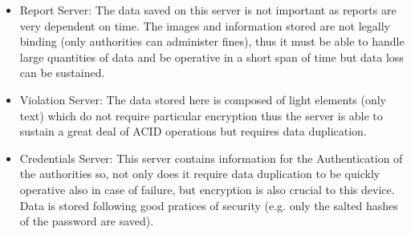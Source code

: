 \begin{itemize}

    \item  Report Server: The data saved on this server is not important as reports are very dependent on time. The images and information
        stored are not legally binding (only authorities can administer fines), thus it must be able to handle large quantities of data and 
        be operative in a short span of time but data loss can be sustained.

    \item Violation Server: The data stored here is composed of light elements (only text) which do not require particular encryption thus the server 
        is able to sustain a great deal of ACID operations but requires data duplication.

    \item Credentials Server: This server contains information for the Authentication of the authorities so, not only does it require data duplication
        to be quickly operative also in case of failure, but encryption is also crucial to this device. Data is stored following good pratices of 
        security (e.g. only the salted hashes of the password are saved).     

\end{itemize}